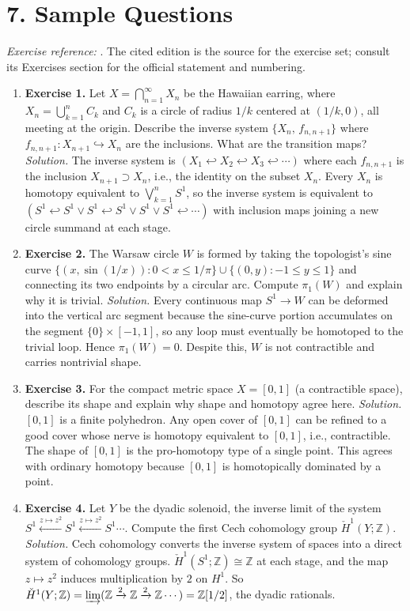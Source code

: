 \section*{7. Sample Questions}
\emph{Exercise reference:} \cite{shape_ref1}. The cited edition is the source for the exercise set; consult its Exercises section for the official statement and numbering.
\begin{enumerate}[leftmargin=*,itemsep=0.9em]
\item \textbf{Exercise 1.} Let $X=\bigcap_{n=1}^{\infty}X_n$ be the Hawaiian earring, where $X_n=\bigcup_{k=1}^{n}C_k$ and $C_k$ is a circle of radius $1/k$ centered at $(1/k,0)$, all meeting at the origin. Describe the inverse system $\{X_n,\,f_{n,n+1}\}$ where $f_{n,n+1}\colon X_{n+1}\hookrightarrow X_n$ are the inclusions. What are the transition maps? \emph{Solution.} The inverse system is $(X_1\hookleftarrow X_2\hookleftarrow X_3\hookleftarrow\cdots)$ where each $f_{n,n+1}$ is the inclusion $X_{n+1}\supset X_n$, i.e., the identity on the subset $X_n$. Every $X_n$ is homotopy equivalent to $\bigvee_{k=1}^{n}S^1$, so the inverse system is equivalent to $(S^1\hookleftarrow S^1\vee S^1\hookleftarrow S^1\vee S^1\vee S^1\hookleftarrow\cdots)$ with inclusion maps joining a new circle summand at each stage.

\item \textbf{Exercise 2.} The Warsaw circle $W$ is formed by taking the topologist's sine curve $\{(x,\sin(1/x)):0<x\leq 1/\pi\}\cup\{(0,y):-1\leq y\leq 1\}$ and connecting its two endpoints by a circular arc. Compute $\pi_1(W)$ and explain why it is trivial. \emph{Solution.} Every continuous map $S^1\to W$ can be deformed into the vertical arc segment because the sine-curve portion accumulates on the segment $\{0\}\times[-1,1]$, so any loop must eventually be homotoped to the trivial loop. Hence $\pi_1(W)=0$. Despite this, $W$ is not contractible and carries nontrivial shape.

\item \textbf{Exercise 3.} For the compact metric space $X=[0,1]$ (a contractible space), describe its shape and explain why shape and homotopy agree here. \emph{Solution.} $[0,1]$ is a finite polyhedron. Any open cover of $[0,1]$ can be refined to a good cover whose nerve is homotopy equivalent to $[0,1]$, i.e., contractible. The shape of $[0,1]$ is the pro-homotopy type of a single point. This agrees with ordinary homotopy because $[0,1]$ is homotopically dominated by a point.

\item \textbf{Exercise 4.} Let $Y$ be the dyadic solenoid, the inverse limit of the system $S^1\xleftarrow{z\mapsto z^2}S^1\xleftarrow{z\mapsto z^2}S^1\cdots$. Compute the first Cech cohomology group $\check{H}^1(Y;\mathbb{Z})$. \emph{Solution.} Cech cohomology converts the inverse system of spaces into a direct system of cohomology groups. $\check{H}^1(S^1;\mathbb{Z})\cong\mathbb{Z}$ at each stage, and the map $z\mapsto z^2$ induces multiplication by $2$ on $H^1$. So $\check{H}^1(Y;\mathbb{Z})=\varinjlim(\mathbb{Z}\xrightarrow{2}\mathbb{Z}\xrightarrow{2}\mathbb{Z}\cdots)=\mathbb{Z}[1/2]$, the dyadic rationals.


\end{enumerate}
